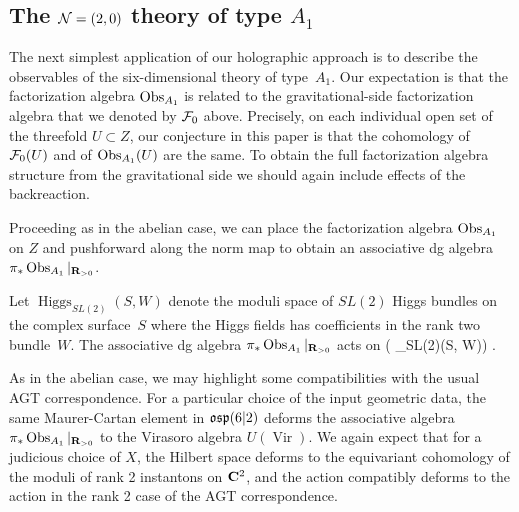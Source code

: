 \subsection*{The $\mathcal N=(2,0)$ theory of type $A_1$} 


The next simplest application of our holographic approach is to describe the observables of the six-dimensional theory of type~$A_1$.
Our expectation is that the factorization algebra $\operatorname{Obs}_{A_1}$ is related to the gravitational-side factorization algebra that we denoted by $\mathcal F_0$ above.
Precisely, on each individual open set of the threefold $U \subset Z$, our conjecture in this paper is that the cohomology of $\mathcal F_0(U)$ and of $\operatorname{Obs}_{A_1}(U)$ are the same.
To obtain the full factorization algebra structure from the gravitational side we should again include effects of the backreaction. 

Proceeding as in the abelian case, we can place the factorization algebra $\operatorname{Obs}_{A_1}$ on $Z$ and pushforward along the norm map to obtain an associative dg algebra $\pi_{*} \operatorname{Obs}_{A_1}|_{\mathbf{R}_{>0}}$.

\begin{conj}
Let $\operatorname{Higgs}_{SL(2)} (S,W)$ denote the moduli space of $SL(2)$ Higgs bundles on the complex surface~$S$ where the Higgs fields has coefficients in the rank two bundle~$W$.
The associative dg algebra $\pi_{*} \operatorname{Obs}_{A_1}|_{\mathbf{R}_{>0}}$ acts on
  \beqn
  \cO \left (  _{SL(2)}(S, W)\right) .
  \eeqn
\end{conj}

As in the abelian case, we may highlight some compatibilities with the usual AGT correspondence. 
For a particular choice of the input geometric data, the same Maurer-Cartan element in $\mathfrak{osp}(6|2)$ deforms the associative algebra $\pi_{*}\operatorname{Obs}_{A_{1}}|_{\mathbf{R}_{>0}}$ to the Virasoro algebra $U(\operatorname{Vir})$. We again expect that for a judicious choice of $X$, the Hilbert space deforms to the equivariant cohomology of the moduli of rank 2 instantons on $\mathbf{C}^{2}$, and the action compatibly deforms to the action in the rank 2 case of the AGT correspondence.

